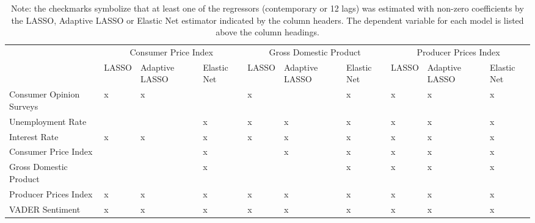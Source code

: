\begin{landscape}
\begin{table}[]
\begin{adjustbox}{max width=\linewidth}
\begin{tabular}{llllllllll}
                         & \multicolumn{3}{c}{Consumer Price Index}       & \multicolumn{3}{c}{Gross Domestic Product} & \multicolumn{3}{c}{Producer Prices Index} \\
                         & LASSO     & Adaptive LASSO    & Elastic Net    & LASSO    & Adaptive LASSO   & Elastic Net  & LASSO   & Adaptive LASSO   & Elastic Net  \\
Consumer Opinion Surveys & x         & x                 &                & x        &                  & x            & x       & x                & x            \\
Unemployment Rate        &           &                   & x              & x        & x                & x            & x       & x                & x            \\
Interest Rate            & x         & x                 & x              & x        & x                & x            & x       & x                & x            \\
Consumer Price Index     &           &                   & x              &          & x                & x            & x       & x                & x            \\
Gross Domestic Product   &           &                   & x              &          &                  & x            & x       & x                & x            \\
Producer Prices Index    & x         & x                 & x              & x        & x                & x            & x       & x                & x            \\ \hline
VADER Sentiment          & x         & x                 & x              & x        & x                & x            & x       & x                & x \\ \hline    
\end{tabular}
\end{adjustbox}
\caption*{Note: the checkmarks symbolize that at least one of the regressors (contemporary or 12 lags) was estimated with non-zero coefficients by the LASSO, Adaptive LASSO or Elastic Net estimator indicated by the column headers. The dependent variable for each model is listed above the column headings.}
\end{table}
\end{landscape}

